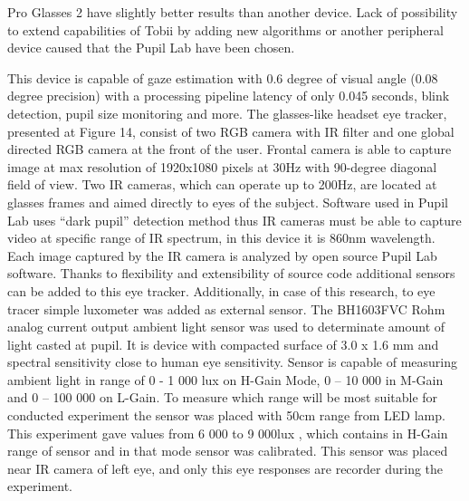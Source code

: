 \documentclass[USenglish,twocolumn]{article}
\begin{document}
Pro Glasses 2 have slightly better results than another device. Lack of possibility to extend capabilities of Tobii by adding new algorithms or another peripheral device caused that the Pupil Lab have been chosen.

This device is capable of gaze estimation with 0.6 degree of visual angle (0.08 degree precision) with a processing pipeline latency of only 0.045 seconds, blink detection, pupil size monitoring and more. The glasses-like headset eye tracker, presented at Figure 14, consist of two RGB camera with IR filter and one global directed RGB camera at the front of the user. Frontal camera is able to capture image at max resolution of 1920x1080 pixels at 30Hz with 90-degree diagonal field of view. Two IR cameras, which can operate up to 200Hz, are located at glasses frames and aimed directly to eyes of the subject. 
Software used in Pupil Lab uses “dark pupil” detection method thus IR cameras must be able to capture video at specific range of IR spectrum, in this device it is 860nm wavelength.  Each image captured by the IR camera is analyzed by open source Pupil Lab software. Thanks to flexibility and extensibility of source code additional sensors can be added to this eye tracker. Additionally, in case of this research, to eye tracer simple luxometer was added as external sensor.  
The BH1603FVC Rohm analog current output ambient light sensor was used to determinate amount of light casted at pupil. It is device with compacted surface of 3.0 x 1.6 mm and spectral sensitivity close to human eye sensitivity.  Sensor is capable of measuring ambient light in range of 0 - 1 000 lux on H-Gain Mode, 0 – 10 000 in M-Gain and 0 – 100 000 on L-Gain.  To measure which range will be most suitable for conducted experiment the sensor was placed with 50cm range from LED lamp. This experiment gave values from 6 000 to 9 000lux , which contains in H-Gain range of sensor and in that mode sensor was calibrated. This sensor was placed near IR camera of left eye, and only this eye responses are recorder during the experiment.
\end{document}
